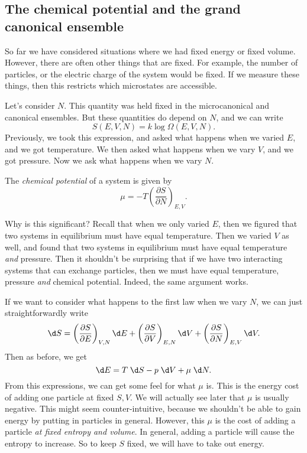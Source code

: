 \documentclass[a4paper]{article}
\begin{document}
\subsection{The chemical potential and the grand canonical ensemble}
So far we have considered situations where we had fixed energy or fixed volume. However, there are often other things that are fixed. For example, the number of particles, or the electric charge of the system would be fixed. If we measure these things, then this restricts which microstates are accessible.

Let's consider $N$. This quantity was held fixed in the microcanonical and canonical ensembles. But these quantities do depend on $N$, and we can write
\[
  S(E, V, N) = k \log \Omega(E, V, N).
\]
Previously, we took this expression, and asked what happens when we varied $E$, and we got temperature. We then asked what happens when we vary $V$, and we got pressure. Now we ask what happens when we vary $N$.
\begin{defi}
  The \emph{chemical potential} of a system is given by
  \[
    \mu = -T \left(\frac{\partial S}{\partial N}\right)_{E, V}.
  \]
\end{defi}

Why is this significant? Recall that when we only varied $E$, then we figured that two systems in equilibrium must have equal temperature. Then we varied $V$ as well, and found that two systems in equilibrium must have equal temperature \emph{and} pressure. Then it shouldn't be surprising that if we have two interacting systems that can exchange particles, then we must have equal temperature, pressure \emph{and} chemical potential. Indeed, the same argument works.

If we want to consider what happens to the first law when we vary $N$, we can just straightforwardly write
\[
  \d S = \left(\frac{\partial S}{\partial E}\right)_{V, N} \d E + \left(\frac{\partial S}{\partial V}\right)_{E, N} \d V + \left(\frac{\partial S}{\partial N}\right)_{E, V} \d V.
\]
Then as before, we get
\[
  \d E = T \;\d S - p \;\d V + \mu \;\d N.
\]
From this expressions, we can get some feel for what $\mu$ is. This is the energy cost of adding one particle at fixed $S, V$. We will actually see later that $\mu$ is usually negative. This might seem counter-intuitive, because we shouldn't be able to gain energy by putting in particles in general. However, this $\mu$ is the cost of adding a particle \emph{at fixed entropy and volume}. In general, adding a particle will cause the entropy to increase. So to keep $S$ fixed, we will have to take out energy.
\end{document}
